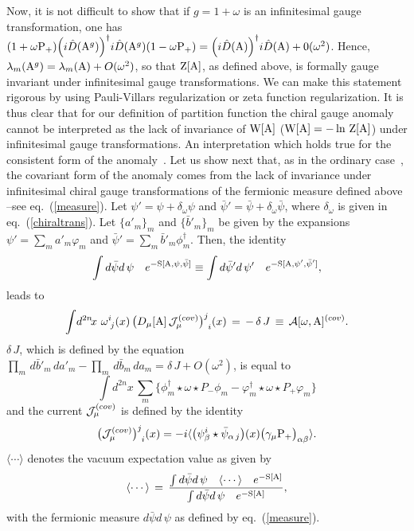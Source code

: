 \documentclass[a4paper,12pt]{article}
\def\cA{{\cal A}}
\def\cJ{{\cal J}}
\def\A{{\rm A}}
\def\W{{\rm W}}
\def\Z{{\rm Z}}
\def\idxn{\int\! d^{2n}\!x \,}
\begin{document}
Now, it is not difficult to show that if $g=1+\omega$ is an infinitesimal 
gauge transformation, one has $(1+\omega{\rm P}_{+})\Big(i\hat{D}(\A^g)\Big)^{\dagger}i\hat{D}(\A^g)
 (1-\omega{\rm P}_{+})=\Big(i\hat{D}(\A)\Big)^{\dagger}i\hat{D}(\A)+
0(\omega^2)$. Hence, $\lambda_m(\A^g)=\lambda_m(\A)+O(\omega^2)$, so that
$\Z[\A]$, as defined above, is formally gauge invariant under infinitesimal 
gauge transformations. We can make this statement rigorous by using Pauli-Villars regularization or zeta function regularization. It is thus clear that 
for our definition of partition function the chiral gauge anomaly cannot be 
interpreted as the lack of invariance of $\W[\A]$ ($\W[\A]=-\ln\,\Z[\A]$)
under infinitesimal gauge transformations. An interpretation which holds 
true for the consistent form of the  
anomaly~\cite{Alvarez-Gaume:1984cs, Bardeen:1984pm}. Let us show 
next that, as in the ordinary case~\cite{Fujikawa:1984bg}, the covariant 
form of the anomaly comes
from the lack of invariance under infinitesimal chiral gauge transformations
of the fermionic measure defined above --see 
eq.~(\ref{measure}). 
Let $\psi'=\psi+\delta_{\omega}\psi$ and  
$\bar{\psi}'=\bar{\psi}+\delta_{\omega}\bar{\psi}$, where $\delta_{\omega}$ is
given in eq.~(\ref{chiraltrans}). Let $\{a'_m\}_m$ and $\{\bar{b}'_m\}_m$ be
given by the expansions  
$\psi'=\sum_ma'_m\varphi_m$ and 
$\bar{\psi}'=\sum_m\bar{b}'_m\phi_m^{\dagger}$. Then, the identity
\begin{displaymath}
\int  d\bar{\psi}d\,\psi\quad e^{-{\rm S}[\A,\psi,\bar{\psi}]}\equiv 
\int  d\bar{\psi}'d\,\psi'\quad e^{-{\rm S}[\A,\psi',\bar{\psi}']},
\end{displaymath}
leads to 
\begin{equation}
\idxn\,\omega^i_{\;j}(x)\, 
\big(D_{\mu}[\A]\,\cJ_\mu^{(cov)}\big)^{j}_{\;\,i}(x)
\,=\,-\,\delta\,J\,\equiv\,\cA[\omega,\A]^{(cov)}.
\label{formalanom}
\end{equation}
$\delta\,J$, which is defined by the equation
$\prod_m\,d\bar{b}'_m\,da'_m-
\prod_m\,d\bar{b}_m\,da_m=\delta\,J+O(\omega^2)$, is equal to
\begin{displaymath}
\idxn\sum_m\{\phi^{\dagger}_m
\star\omega\star P_{-}\phi_m-
\varphi^{\dagger}_m\star\omega\star P_{+}\varphi_m\}
\end{displaymath}
and the current $\cJ_\mu^{(cov)}$ is defined by the identity 
\begin{displaymath}
\big(\cJ_\mu^{(cov)}\big)^{j}_{\;\,i}(x)=
-i\langle \big(\psi^i_{\beta}\star\bar{\psi}_{\alpha\,j}\big)(x)
\big(\gamma_{\mu}{\rm P}_{+}\big)_{\alpha\beta}\rangle.
\end{displaymath}
$\langle\cdots \rangle$ denotes the vacuum expectation value as given by 
\begin{displaymath}
\langle\cdots \rangle\,=\,
\frac{\int  d\bar{\psi}d\,\psi\quad\langle\cdots \rangle\quad e^{-{\rm S}[\A]}}
{\int  d\bar{\psi}d\,\psi\quad  e^{-{\rm S}[\A]}},
\end{displaymath}
with the fermionic measure $d\bar{\psi}d\,\psi$ as defined by 
eq.~(\ref{measure}).
\end{document}
